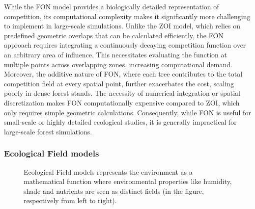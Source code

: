 
While the FON model provides a biologically detailed representation of competition, its computational complexity makes it significantly more challenging to implement in large-scale simulations. Unlike the ZOI model, which relies on predefined geometric overlaps that can be calculated efficiently, the FON approach requires integrating a continuously decaying competition function over an arbitrary area of influence. This necessitates evaluating the function at multiple points across overlapping zones, increasing computational demand. Moreover, the additive nature of FON, where each tree contributes to the total competition field at every spatial point, further exacerbates the cost, scaling poorly in dense forest stands. The necessity of numerical integration or spatial discretization makes FON computationally expensive compared to ZOI, which only requires simple geometric calculations. Consequently, while FON is useful for small-scale or highly detailed ecological studies, it is generally impractical for large-scale forest simulations.



\subsubsection{Ecological Field models}

\begin{figure}[H]
    \centering
    \caption{Ecological Field models represents the environment as a mathematical function where environmental properties like humidity, shade and nutrients are seen as distinct fields (in the figure, respectively from left to right). }
    \label{fig:env-obj_ecological-field-models}    
\end{figure}

